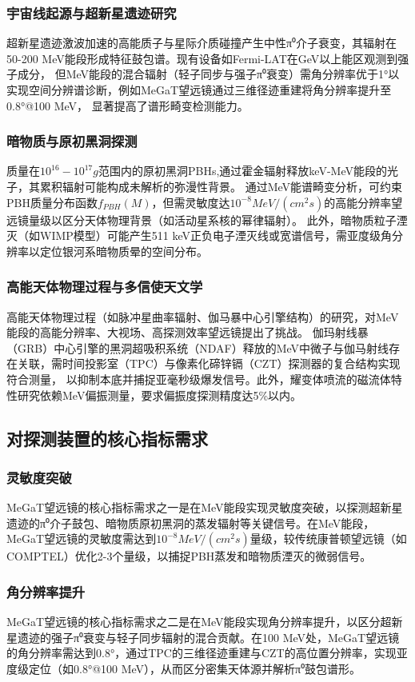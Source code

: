 \subsubsection{宇宙线起源与超新星遗迹研究}
	超新星遗迹激波加速的高能质子与星际介质碰撞产生中性π⁰介子衰变，其辐射在50-200 MeV能段形成特征鼓包谱。现有设备如Fermi-LAT在GeV以上能区观测到强子成分，
	但MeV能段的混合辐射（轻子同步与强子π⁰衰变）需角分辨率优于1°以实现空间分辨谱诊断，例如MeGaT望远镜通过三维径迹重建将角分辨率提升至0.8°@100 MeV，
	显著提高了谱形畸变检测能力。
\subsubsection{暗物质与原初黑洞探测}
	质量在$10^{16}-10^{17}g$范围内的原初黑洞PBHs,通过霍金辐射释放keV-MeV能段的光子，其累积辐射可能构成未解析的弥漫性背景。
	通过MeV能谱畸变分析，可约束PBH质量分布函数$f_{PBH}(M)$，但需灵敏度达$10^{-8}MeV/(cm^2s)$的高能分辨率望远镜量级以区分天体物理背景（如活动星系核的幂律辐射）。
	此外，暗物质粒子湮灭（如WIMP模型）可能产生511 keV正负电子湮灭线或宽谱信号，需亚度级角分辨率以定位银河系暗物质晕的空间分布。
\subsubsection{高能天体物理过程与多信使天文学}
	高能天体物理过程（如脉冲星曲率辐射、伽马暴中心引擎结构）的研究，对MeV能段的高能分辨率、大视场、高探测效率望远镜提出了挑战。
	伽玛射线暴（GRB）中心引擎的黑洞超吸积系统（NDAF）释放的MeV中微子与伽马射线存在关联，需时间投影室（TPC）与像素化碲锌镉（CZT）探测器的复合结构实现符合测量，
	以抑制本底并捕捉亚毫秒级爆发信号。此外，耀变体喷流的磁流体特性研究依赖MeV偏振测量，要求偏振度探测精度达5\%以内。
\subsection{对探测装置的核心指标需求}

\subsubsection{灵敏度突破}
	MeGaT望远镜的核心指标需求之一是在MeV能段实现灵敏度突破，以探测超新星遗迹的π⁰介子鼓包、暗物质原初黑洞的蒸发辐射等关键信号。在MeV能段，MeGaT望远镜的灵敏度需达到$10^{-8}MeV/(cm^2s)$量级，较传统康普顿望远镜（如COMPTEL）优化2-3个量级，以捕捉PBH蒸发和暗物质湮灭的微弱信号。	
\subsubsection{角分辨率提升}
	MeGaT望远镜的核心指标需求之二是在MeV能段实现角分辨率提升，以区分超新星遗迹的强子π⁰衰变与轻子同步辐射的混合贡献。在100 MeV处，MeGaT望远镜的角分辨率需达到0.8°，通过TPC的三维径迹重建与CZT的高位置分辨率，实现亚度级定位（如0.8°@100 MeV），从而区分密集天体源并解析π⁰鼓包谱形。
